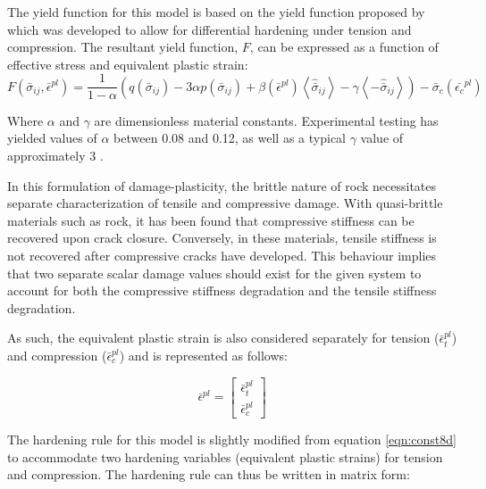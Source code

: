 The yield function for this model is based on the yield function proposed by \citet{lee_plastic-damage_1998} which was developed to allow for differential hardening under tension and compression. The resultant yield function, $F$, can be expressed as a function of effective stress and equivalent plastic strain:
\begin{equation}
    F
    \left(\bar{\sigma}_{ij},\bar{\epsilon}^{pl}\right)
    =
    \frac{1}{1-\alpha}
    \left(
        q\left(\bar{\sigma}_{ij}\right)-3\alpha p\left(\bar{\sigma}_{ij}\right)+\beta\left(\bar{\epsilon}^{pl}\right)
        \left\langle\hat{\bar{\sigma}}_{ij}\right\rangle-\gamma\left\langle-\hat{\bar{\sigma}}_{ij}\right\rangle\right)
    -\bar{\sigma}_{c}
    \left(
        \bar{\epsilon_{c}}^{pl}
    \right)
\label{eqn:const10}
\end{equation}

Where $\alpha$ and $\gamma$ are dimensionless material constants. Experimental testing has yielded values of $\alpha$ between 0.08 and 0.12, as well as a typical $\gamma$ value of approximately 3 \cite{lubliner_plastic-damage_1989}. 

In this formulation of damage-plasticity, the brittle nature of rock necessitates separate characterization of tensile and compressive damage. With quasi-brittle materials such as rock, it has been found that compressive stiffness can be recovered upon crack closure. Conversely, in these materials, tensile stiffness is not recovered after compressive cracks have developed. This behaviour implies that two separate scalar damage values should exist for the given system to account for both the compressive stiffness degradation and the tensile stiffness degradation. 

As such, the equivalent plastic strain is also considered separately for tension ($\bar{\epsilon}_{t}^{pl}$) and compression ($\bar{\epsilon}_{c}^{pl}$) and is represented as follows: 

\begin{equation}
\bar{\epsilon}^{pl}=
\left[
\begin{array}{c}
    \bar{\epsilon}_{t}^{pl}\\
    \bar{\epsilon}_{c}^{pl}
\end{array}
\right]
\label{eqn:const9}
\end{equation}


The hardening rule for this model is slightly modified from equation \ref{eqn:const8d} to accommodate two hardening variables (equivalent plastic strains) for tension and compression. The hardening rule can thus be written in matrix form:

